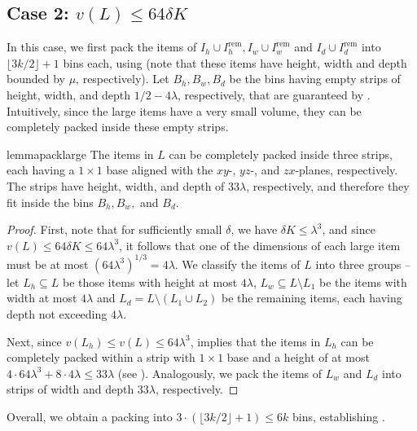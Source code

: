 \documentclass[a4paper,UKenglish,cleveref, autoref, thm-restate]{lipics-v2021}
\renewcommand{\epsilon}{\lambda}
\begin{document}
\subsection{Case 2: \texorpdfstring{$v(L)\le 64\delta K$}{small volume for L}}
\label{sec:largehassmallvol}

In this case, we first pack the items of $I_h\cup I^{\text{rem}}_h, I_w \cup I^{\text{rem}}_w$ and $I_d \cup I^{\text{rem}}_d$ into $\lfloor 3k/2 \rfloor + 1$ bins each, using  (note that these items have height, width and depth bounded by $\mu$, respectively). Let $B_h, B_w, B_d$ be the bins having empty strips of height, width, and depth $1/2-4\epsilon$, respectively, that are guaranteed by . Intuitively, since the large items have a very small volume, they can be completely packed inside these empty strips.

\begin{restatable}{lemma}{packlarge}
\label{lem:packlarge}
    The items in $L$ can be completely packed inside three strips, each having a $1\times 1$ base aligned with the $xy$-, $yz$-, and $zx$-planes, respectively. The strips have height, width, and depth of $33\epsilon$, respectively, and therefore they fit inside the bins $B_h, B_w,$ and $B_d$.
\end{restatable}
\begin{proof}
    First, note that for sufficiently small $\delta$, we have $\delta K \le \epsilon^3$, and since $v(L) \le 64\delta K \le 64\lambda^3$, it follows that one of the dimensions of each large item must be at most $(64\epsilon^3)^{1/3}=4\epsilon$. We classify the items of $L$ into three groups -- let $L_h \subseteq L$ be those items with height at most $4\epsilon$, $L_w \subseteq L\setminus L_1$ be the items with width at most $4\epsilon$ and $L_d = L\setminus (L_1\cup L_2)$ be the remaining items, each having depth not exceeding $4\epsilon$. 
    
    Next, since $v(L_h)\le v(L)\le 64\lambda^3$,  implies that the items in $L_h$ can be completely packed within a strip with $1\times 1$ base and a height of at most $4\cdot 64\lambda^3 + 8\cdot 4\epsilon \le 33\epsilon$ (see ). Analogously, we pack the items of $L_w$ and $L_d$ into strips of width and depth $33\lambda$, respectively.
\end{proof}

\noindent Overall, we obtain a packing into $3\cdot (\lfloor 3k/2 \rfloor +1) \le 6k$ bins, establishing .
\end{document}
